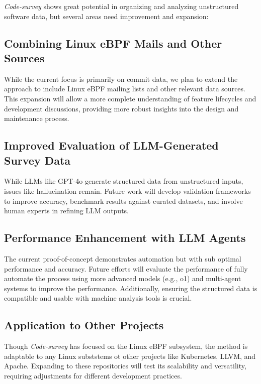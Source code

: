\emph{Code-survey} shows great potential in organizing and analyzing unstructured software data, but several areas need improvement and expansion:

\subsection{Combining Linux eBPF Mails and Other Sources}

While the current focus is primarily on commit data, we plan to extend the approach to include Linux eBPF mailing lists and other relevant data sources. This expansion will allow a more complete understanding of feature lifecycles and development discussions, providing more robust insights into the design and maintenance process.

\subsection{Improved Evaluation of LLM-Generated Survey Data}

While LLMs like GPT-4o generate structured data from unstructured inputs, issues like hallucination remain. Future work will develop validation frameworks to improve accuracy, benchmark results against curated datasets, and involve human experts in refining LLM outputs.

\subsection{Performance Enhancement with LLM Agents}

The current proof-of-concept demonstrates automation but with sub optimal performance and accuracy. Future efforts will evaluate the performance of fully automate the process using more advanced models (e.g., o1) and multi-agent systems to improve the performance. Additionally, ensuring the structured data is compatible and usable with machine analysis tools is crucial.

\subsection{Application to Other Projects}

Though \emph{Code-survey} has focused on the Linux eBPF subsystem, the method is adaptable to any Linux subststems ot other projects like Kubernetes, LLVM, and Apache. Expanding to these repositories will test its scalability and versatility, requiring adjustments for different development practices.

